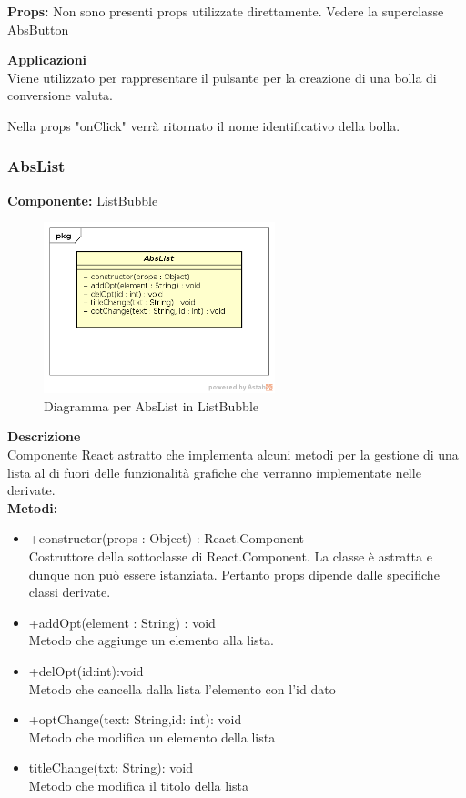 \textbf{Props:} 
Non sono presenti props utilizzate direttamente. Vedere la superclasse AbsButton 


\textbf{Applicazioni}\\
Viene utilizzato per rappresentare il pulsante per la creazione di una bolla di conversione valuta.

Nella props "onClick" verrà ritornato il nome identificativo della bolla. 


\clearpage

\subsubsection{AbsList}
\textbf{Componente:}  ListBubble\\
   \FloatBarrier
   \begin{figure}[ht]
   \centering
   \includegraphics[width=0.6\textwidth]{img/single-AbsList.png}
   \caption{{Diagramma per AbsList in ListBubble}}
\end{figure}
\FloatBarrier
\textbf{Descrizione}\\
Componente React astratto che implementa alcuni metodi per la gestione di una lista al di fuori delle funzionalità grafiche che verranno implementate nelle derivate.
\\
\textbf{Metodi:} 
\begin{itemize}
\item +constructor(props : Object) : React.Component 
\\
Costruttore della sottoclasse di React.Component. La classe è astratta e dunque non può essere istanziata. Pertanto props dipende dalle specifiche classi derivate.

\item +addOpt(element : String) : void 
\\
Metodo che aggiunge un elemento alla lista.
\item +delOpt(id:int):void
\\
Metodo che cancella dalla lista l'elemento con l'id dato
\item +optChange(text: String,id: int): void
\\
Metodo che modifica un elemento della lista
\item titleChange(txt: String): void
\\
Metodo che modifica il titolo della lista

\end{itemize} 


